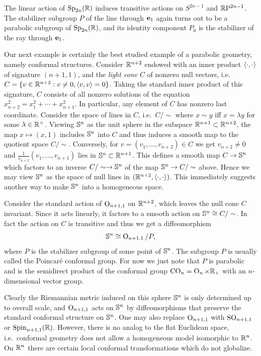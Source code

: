 \begin{defn}
    The linear action of $\Sp_{2n}(\bbR)$ induces transitive actions on $S^{2n-1}$ and $\RP^{2n-1}$. The stabilizer subgroup $P$ of the line through $\bf{e}_1$ again turns out to be a parabolic subgroup of $\Sp_{2n}(\bbR)$, and its identity component $P_0$ is the stabilizer of the ray through $\bf{e}_1$.
\end{defn}


Our next example is certainly the best studied example of a parabolic geometry, namely conformal structures. Consider $\bbR^{n+2}$ endowed with an inner product $\<\cdot,\cdot\>$ of signature $(n+1,1)$, and the \emph{light cone} $C$ of nonzero null vectors, i.e.\ $C=\{v\in\bbR^{n+2}:v\neq 0,\<v,v\>=0\}$. Taking the standard inner product of this signature, $C$ consists of all nonzero solutions of the equation $x_{n+2}^2=x_1^2+\cdots +x_{n+1}^2$. In particular, any element of $C$ has nonzero last coordinate. Consider the space of lines in $C$, i.e.\ $C\slash \sim$ where $x\sim y$ iff $x=\lambda y$ for some $\lambda \in \bbR^\times$. Viewing $\bbS^n$ as the unit sphere in the subspace $\bbR^{n+1}\subset \bbR^{n+2}$, the map $x\mapsto (x,1)$ includes $\bbS^n$ into $C$ and thus induces a smooth map to the quotient space $C\slash \sim$. Conversely, for $v=(v_1,\ldots,v_{n+2})\in C$ we get $v_{n+2}\neq 0$ and $\frac{1}{v_{n+2}}(v_1,\ldots,v_{n+1})$ lies in $\bbS^n\subset \bbR^{n+1}$. This defines a smooth map $C\to \bbS^n$ which factors to an inverse $C\slash \sim\to \bbS^n$ of the map $\bbS^n\to C\slash \sim$ above. Hence we may view $\bbS^n$ as the space of null lines in $(\bbR^{n+2},\<\cdot,\cdot\>)$. This immediately suggests another way to make $\bbS^n$ into a homogeneous space.

\begin{defn}
    Consider the standard action of $\Or_{n+1,1}$ on $\bbR^{n+2}$, which leaves the null cone $C$ invariant. Since it acts linearly, it factors to a smooth action on $\bbS^n\cong C\slash \sim$. In fact the action on $C$ is transitive and thus we get a diffeomorphism
    \[\bbS^n\cong \Or_{n+1,1}\slash P,\]
    where $P$ is the stabilizer subgroup of some point of $\bbS^n$. The subgroup $P$ is usually called the Poincar\'e conformal group. For now we just note that $P$ is parabolic and is the semidirect product of the conformal group $\CO_n=\Or_n\times\bbR_+$ with an $n$-dimensional vector group.
\end{defn}

Clearly the Riemannian metric induced on this sphere $\bbS^n$ is only determined up to overall scale, and $\Or_{n+1,1}$ acts on $\bbS^n$ by diffeomorphisms that preserve the standard conformal structure on $\bbS^n$. One may also replace $\Or_{n+1,1}$ with $\SO_{n+1,1}$ or $\Spin_{n+1,1}(\bbR)$. However, there is no analog to the flat Euclidean space, i.e.\ conformal geometry does not allow a homogeneous model isomorphic to $\bbR^n$. On $\bbR^n$ there are certain local conformal transformations which do not globalize.

